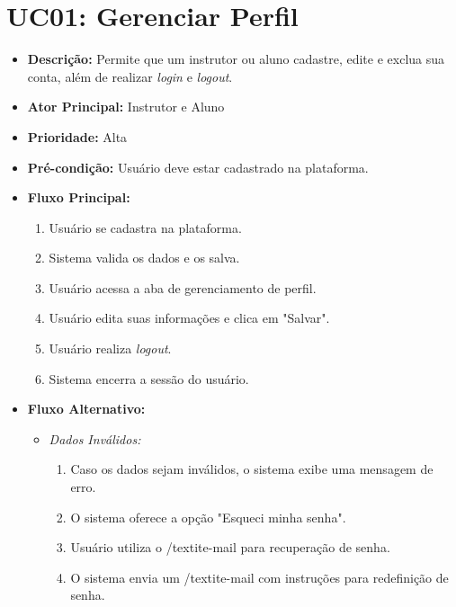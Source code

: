         \section*{UC01: Gerenciar Perfil}

        \begin{itemize}
            \item \textbf{Descrição:} Permite que um instrutor ou aluno cadastre, edite e exclua sua conta, além de realizar \textit{login} e \textit{logout}.
            
            \item \textbf{Ator Principal:} Instrutor e Aluno
            
            \item \textbf{Prioridade:} Alta
            
            \item \textbf{Pré-condição:} Usuário deve estar cadastrado na plataforma.
            
            \item \textbf{Fluxo Principal:}
            \begin{enumerate}
                \item Usuário se cadastra na plataforma.
                \item Sistema valida os dados e os salva.
                \item Usuário acessa a aba de gerenciamento de perfil.
                \item Usuário edita suas informações e clica em "Salvar".
                \item Usuário realiza \textit{logout}.
                \item Sistema encerra a sessão do usuário.
            \end{enumerate}

            \item \textbf{Fluxo Alternativo:}
            \begin{itemize}
                \item \textit{Dados Inválidos:}
                \begin{enumerate}
                    \item Caso os dados sejam inválidos, o sistema exibe uma mensagem de erro.
                    \item O sistema oferece a opção "Esqueci minha senha".
                    \item Usuário utiliza o /textit{e-mail} para recuperação de senha.
                    \item O sistema envia um /textit{e-mail} com instruções para redefinição de senha.
                \end{enumerate}
            \end{itemize}
        \end{itemize}

